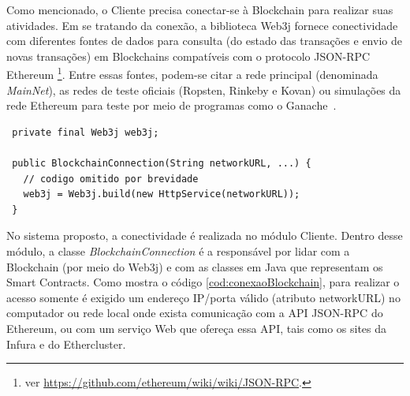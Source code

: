 \documentclass[a4paper,11pt]{article}
\begin{document}





Como mencionado, o Cliente precisa conectar-se à Blockchain para realizar suas atividades.
Em se tratando da conexão, a biblioteca Web3j fornece conectividade com diferentes fontes de dados para consulta (do estado das transações e envio de novas transações) em Blockchains compatíveis com o protocolo JSON-RPC Ethereum
\footnote{ver \href{https://github.com/ethereum/wiki/wiki/JSON-RPC}{https://github.com/ethereum/wiki/wiki/JSON-RPC}.}.
Entre essas fontes, podem-se citar a rede principal (denominada \emph{MainNet}), as redes de teste oficiais (Ropsten, Rinkeby e Kovan) ou simulações da rede Ethereum para teste por meio de programas como o Ganache~\cite{Ganache2020}.


\begin{lstlisting}
 private final Web3j web3j;

 public BlockchainConnection(String networkURL, ...) {
   // codigo omitido por brevidade
   web3j = Web3j.build(new HttpService(networkURL));
 }
\end{lstlisting}


No sistema proposto, a conectividade é realizada no módulo Cliente.
Dentro desse módulo, a classe \emph{BlockchainConnection} é a responsável por lidar com a Blockchain (por meio do Web3j) e com as classes em Java que representam os Smart Contracts. Como mostra o código \ref{cod:conexaoBlockchain}, para realizar o acesso  somente é exigido um endereço IP/porta válido (atributo networkURL) no computador ou rede local onde exista comunicação com a API JSON-RPC do Ethereum, ou com um serviço Web que ofereça essa API, tais como os sites da Infura e do Ethercluster.
\end{document}
